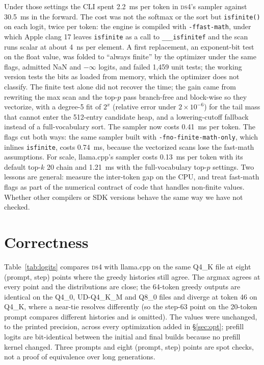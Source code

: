 \documentclass[11pt]{article}
\newcommand{\ds}{\textsc{ds4}}
\begin{document}
Under those settings the CLI spent 2.2~ms per token in \ds{}'s sampler
against 30.5~ms in the forward. The cost was not the softmax or the sort but
\texttt{isfinite()} on each logit, twice per token: the engine is compiled
with \texttt{-ffast-math}, under which Apple clang 17 leaves \texttt{isfinite}
as a call to \texttt{\_\_\_isfinitef} and the scan runs scalar at about 4~ns
per element. A first replacement, an exponent-bit test on the float value,
was folded to ``always finite'' by the optimizer under the same flags,
admitted NaN and $-\infty$ logits, and failed 1,459 unit tests; the working
version tests the bits as loaded from memory, which the optimizer does not
classify. The finite test alone did not recover the time; the gain came from
rewriting the max scan and the top-$p$ pass branch-free and block-wise so
they vectorize, with a degree-5 fit of $2^x$ (relative error under $2\times
10^{-6}$) for the tail mass that cannot enter the 512-entry candidate heap,
and a lowering-cutoff fallback instead of a full-vocabulary sort. The sampler
now costs 0.41~ms per token. The flags cut both ways: the same sampler built
with \texttt{-fno-finite-math-only}, which inlines \texttt{isfinite}, costs
0.74~ms, because the vectorized scans lose the fast-math assumptions. For
scale, llama.cpp's sampler costs 0.13~ms per token with its default top-$k$
20 chain and 1.21~ms with the full-vocabulary top-$p$ settings. Two lessons are general: measure the inter-token gap on the
CPU, and treat fast-math flags as part of the numerical contract of code that
handles non-finite values. Whether other compilers or SDK versions behave the
same way we have not checked.

\section{Correctness}
\label{sec:correctness}
Table~\ref{tab:logits} compares \ds{} with llama.cpp on the same Q4\_K file at
eight (prompt, step) points where the greedy histories still agree. The
argmax agrees at every point and the distributions are close; the 64-token
greedy outputs are identical on the Q4\_0, UD-Q4\_K\_M and Q8\_0 files and
diverge at token 46 on Q4\_K, where a near-tie resolves differently (so the
step-63 point on the 20-token prompt compares different histories and is
omitted). The values were unchanged, to the printed
precision, across every optimization added in \S\ref{sec:opt}; prefill logits are bit-identical between the initial and final builds because no
prefill kernel changed. Three prompts and eight (prompt, step) points are spot
checks, not a proof of equivalence over long generations.
\end{document}
